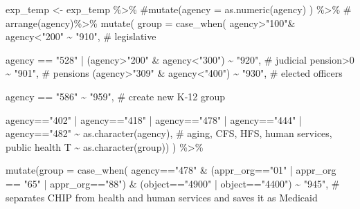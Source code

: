 \documentclass[
  letterpaper,
  DIV=11,
  numbers=noendperiod]{scrreport}
\newenvironment{Shaded}{\begin{snugshade}}{\end{snugshade}}
\newcommand{\AttributeTok}[1]{\textcolor[rgb]{0.40,0.45,0.13}{#1}}
\newcommand{\CommentTok}[1]{\textcolor[rgb]{0.37,0.37,0.37}{#1}}
\newcommand{\DecValTok}[1]{\textcolor[rgb]{0.68,0.00,0.00}{#1}}
\newcommand{\FunctionTok}[1]{\textcolor[rgb]{0.28,0.35,0.67}{#1}}
\newcommand{\NormalTok}[1]{\textcolor[rgb]{0.00,0.23,0.31}{#1}}
\newcommand{\OtherTok}[1]{\textcolor[rgb]{0.00,0.23,0.31}{#1}}
\newcommand{\SpecialCharTok}[1]{\textcolor[rgb]{0.37,0.37,0.37}{#1}}
\newcommand{\StringTok}[1]{\textcolor[rgb]{0.13,0.47,0.30}{#1}}
\begin{document}
\begin{Shaded}
\begin{Highlighting}[]
\NormalTok{exp\_temp }\OtherTok{\textless{}{-}}\NormalTok{ exp\_temp }\SpecialCharTok{\%\textgreater{}\%}
  \CommentTok{\#mutate(agency = as.numeric(agency) ) \%\textgreater{}\%}
  \CommentTok{\# arrange(agency)\%\textgreater{}\%}
  \FunctionTok{mutate}\NormalTok{(}
    \AttributeTok{group =} \FunctionTok{case\_when}\NormalTok{(}
\NormalTok{      agency}\SpecialCharTok{\textgreater{}}\StringTok{"100"}\SpecialCharTok{\&}\NormalTok{ agency}\SpecialCharTok{\textless{}}\StringTok{"200"} \SpecialCharTok{\textasciitilde{}} \StringTok{"910"}\NormalTok{, }\CommentTok{\# legislative}
      
\NormalTok{      agency }\SpecialCharTok{==} \StringTok{"528"}  \SpecialCharTok{|}\NormalTok{ (agency}\SpecialCharTok{\textgreater{}}\StringTok{"200"} \SpecialCharTok{\&}\NormalTok{ agency}\SpecialCharTok{\textless{}}\StringTok{"300"}\NormalTok{) }\SpecialCharTok{\textasciitilde{}} \StringTok{"920"}\NormalTok{, }\CommentTok{\# judicial}
\NormalTok{      pension}\SpecialCharTok{\textgreater{}}\DecValTok{0}  \SpecialCharTok{\textasciitilde{}} \StringTok{"901"}\NormalTok{, }\CommentTok{\# pensions}
\NormalTok{      (agency}\SpecialCharTok{\textgreater{}}\StringTok{"309"} \SpecialCharTok{\&}\NormalTok{ agency}\SpecialCharTok{\textless{}}\StringTok{"400"}\NormalTok{) }\SpecialCharTok{\textasciitilde{}} \StringTok{"930"}\NormalTok{,    }\CommentTok{\# elected officers}
      
\NormalTok{      agency }\SpecialCharTok{==} \StringTok{"586"} \SpecialCharTok{\textasciitilde{}} \StringTok{"959"}\NormalTok{, }\CommentTok{\# create new K{-}12 group}

\NormalTok{      agency}\SpecialCharTok{==}\StringTok{"402"} \SpecialCharTok{|}\NormalTok{ agency}\SpecialCharTok{==}\StringTok{"418"} \SpecialCharTok{|}\NormalTok{ agency}\SpecialCharTok{==}\StringTok{"478"} \SpecialCharTok{|}\NormalTok{ agency}\SpecialCharTok{==}\StringTok{"444"} \SpecialCharTok{|}\NormalTok{ agency}\SpecialCharTok{==}\StringTok{"482"} \SpecialCharTok{\textasciitilde{}} \FunctionTok{as.character}\NormalTok{(agency), }\CommentTok{\# aging, CFS, HFS, human services, public health}
\NormalTok{      T }\SpecialCharTok{\textasciitilde{}} \FunctionTok{as.character}\NormalTok{(group))}
\NormalTok{    ) }\SpecialCharTok{\%\textgreater{}\%}      

  
  \FunctionTok{mutate}\NormalTok{(}\AttributeTok{group =} \FunctionTok{case\_when}\NormalTok{(}
\NormalTok{    agency}\SpecialCharTok{==}\StringTok{"478"} \SpecialCharTok{\&}\NormalTok{ (appr\_org}\SpecialCharTok{==}\StringTok{"01"} \SpecialCharTok{|}\NormalTok{ appr\_org }\SpecialCharTok{==} \StringTok{"65"} \SpecialCharTok{|}\NormalTok{ appr\_org}\SpecialCharTok{==}\StringTok{"88"}\NormalTok{) }\SpecialCharTok{\&}\NormalTok{ (object}\SpecialCharTok{==}\StringTok{"4900"} \SpecialCharTok{|}\NormalTok{ object}\SpecialCharTok{==}\StringTok{"4400"}\NormalTok{) }\SpecialCharTok{\textasciitilde{}} \StringTok{"945"}\NormalTok{, }\CommentTok{\# separates CHIP from health and human services and saves it as Medicaid}
    

\end{Highlighting}
\end{Shaded}
\end{document}
